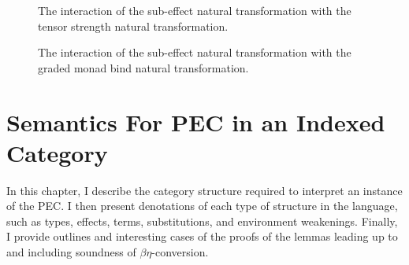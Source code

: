 \documentclass{Report}
\begin{document}
\begin{figure}
\centering
\begin{minipage}{0.45\textwidth}
    \qquad
    \caption{The interaction of the sub-effect natural transformation with the tensor strength natural transformation.}
    \label{SubeffectTensorStrength}
\end{minipage}  
\quad
\begin{minipage}{0.45\textwidth}
\caption{The interaction of the sub-effect natural transformation with the graded monad  bind natural transformation.}
\label{SubeffectBind}
\end{minipage}  
\end{figure}






\chapter{Semantics For PEC in an Indexed Category}


In this chapter, I  describe the category structure required to interpret an instance of the PEC. I then present denotations of each type of structure in the language, such as types, effects, terms, substitutions, and environment weakenings. Finally, I provide outlines and interesting cases of the proofs of the lemmas leading up to and including soundness of $\beta\eta$-conversion. 
\end{document}
